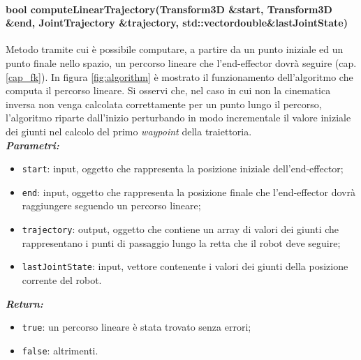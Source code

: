 \paragraph{bool computeLinearTrajectory(Transform3D \&start, Transform3D \&end, JointTrajectory \&trajectory, std::vector\tl double\tr \&lastJointState)}
Metodo tramite cui è possibile computare, a partire da un punto iniziale ed un punto finale nello spazio, un percorso lineare che l'end-effector dovrà seguire (cap.\ref{cap_fk}). In figura \ref{fig:algorithm} è mostrato il funzionamento dell'algoritmo che computa il percorso lineare. Si osservi che, nel caso in cui non la cinematica inversa non venga calcolata correttamente per un punto lungo il percorso, l'algoritmo riparte dall'inizio perturbando in modo incrementale il valore iniziale dei giunti nel calcolo del primo \textit{waypoint} della traiettoria. \\
\textbf{\textit{Parametri:}}
\begin{itemize}
	\item \texttt{start}: input, oggetto che rappresenta la posizione iniziale dell'end-effector;
	\item \texttt{end}: input, oggetto che rappresenta la posizione finale  che l'end-effector dovrà raggiungere seguendo un percorso lineare;
	\item \texttt{trajectory}: output, oggetto che contiene un array di valori dei giunti che rappresentano i punti di passaggio lungo la retta che il robot deve seguire;
	\item \texttt{lastJointState}: input, vettore contenente i valori dei giunti della posizione corrente del robot. 
\end{itemize}
\textbf{\textit{Return:}}
\begin{itemize}
	\item \texttt{true}: un percorso lineare è stata trovato senza errori;
	\item \texttt{false}: altrimenti.
\end{itemize}

